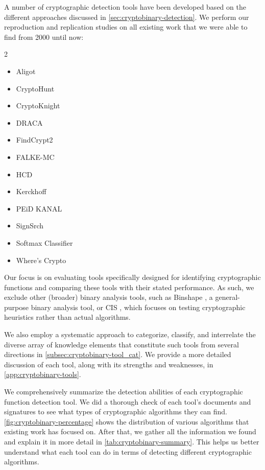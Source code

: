 A number of cryptographic detection tools have been developed based on the different approaches discussed in \autoref{sec:cryptobinary-detection}. We perform our reproduction and replication studies on all existing work that we were able to find from 2000 until now:
\vspace*{-10pt}
\setlength{\columnsep}{-20pt}
\begin{multicols}{2}
\begin{itemize}[noitemsep,topsep=0pt]
    \setlength{\itemsep}{0pt}
    \setlength{\parskip}{0pt}
\item Aligot \cite{calvet2012aligot}
\item CryptoHunt \cite{xu2017cryptographic}
\item CryptoKnight \cite{hill2018cryptoknight}
\item DRACA \cite{draca}
\item FindCrypt2 \cite{findcrypt2}
\item FALKE-MC \cite{aigner2018falke}
\item HCD \cite{hcd}
\item Kerckhoff \cite{kerckhoffs}
\item PEiD KANAL \cite{kanal}
\item SignSrch \cite{signsrch}
\item Softmax Classifier \cite{jia2020neural}
\item Where's Crypto \cite{meijer2021s}
\end{itemize}
\end{multicols}
\vspace*{-5pt}
Our focus is on evaluating tools specifically designed for identifying cryptographic functions and comparing these tools with their stated performance. As such, we exclude other (broader) binary analysis tools, such as Binshape \cite{shirani2017binshape}, a general-purpose binary analysis tool, or CIS \cite{matenaar2012cis}, which focuses on testing cryptographic heuristics rather than actual algorithms.

We also employ a systematic approach to categorize, classify, and interrelate the diverse array of knowledge elements that constitute such tools from several directions in \autoref{subsec:cryptobinary-tool_cat}. We provide a more detailed discussion of each tool, along with its strengths and weaknesses, in \autoref{app:cryptobinary-tools}.

We comprehensively summarize the detection abilities of each cryptographic function detection tool. We did a thorough check of each tool's documents and signatures to see what types of cryptographic algorithms they can find. \autoref{fig:cryptobinary-percentage} shows the distribution of various algorithms that existing work has focused on.
After that, we gather all the information we found and explain it in more detail in \autoref{tab:cryptobinary-summary}. This helps us better understand what each tool can do in terms of detecting different cryptographic algorithms.


